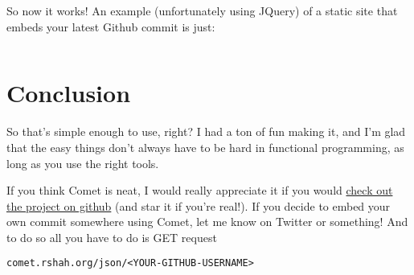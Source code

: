 \documentclass[12pt]{article}
\begin{document}
  So now it works! An example (unfortunately using JQuery) of a static site that embeds your latest Github commit is just:

  \inputminted[]{html}{../resources/elixir-of-life/index.html}

  \section{Conclusion}
  So that's simple enough to use, right? I had a ton of fun making it, and I'm glad that the easy things don't always have to be hard in functional programming, as long as you use the right tools. 

  If you think Comet is neat, I would really appreciate it if you would \href{https://github.com/2016rshah/comet}{check out the project on github} (and star it if you're real!). If you decide to embed your own commit somewhere using Comet, let me know on Twitter or something! And to do so all you have to do is GET request 

  \begin{center}
  \texttt{comet.rshah.org/json/<YOUR-GITHUB-USERNAME>}
  \end{center}
\end{document}
